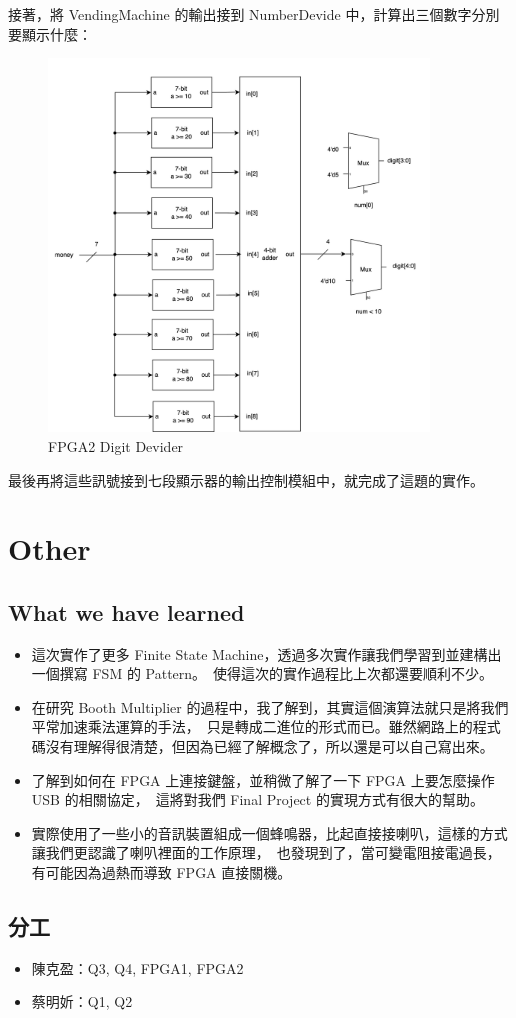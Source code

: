 \documentclass[10.5pt,compsoc,UTF8]{CjC}
\theoremstyle{mystyle}
\begin{document}
\newpage

接著，將 VendingMachine 的輸出接到 NumberDevide 中，計算出三個數字分別要顯示什麼：

\begin{figure}[h!]
  \centering
  \includegraphics[width=0.9\textwidth]{./img/FPGA2-digit.png}
  \caption{FPGA2 Digit Devider}
  \label{fig:FPGA2-digit}
\end{figure}

最後再將這些訊號接到七段顯示器的輸出控制模組中，就完成了這題的實作。

\newpage

\section{Other}

\subsection{What we have learned}
\begin{itemize}
  \item 這次實作了更多 Finite State Machine，透過多次實作讓我們學習到並建構出一個撰寫 FSM 的 Pattern。\
        使得這次的實作過程比上次都還要順利不少。
  \item 在研究 Booth Multiplier 的過程中，我了解到，其實這個演算法就只是將我們平常加速乘法運算的手法，\
        只是轉成二進位的形式而已。雖然網路上的程式碼沒有理解得很清楚，但因為已經了解概念了，所以還是可以自己寫出來。
  \item 了解到如何在 FPGA 上連接鍵盤，並稍微了解了一下 FPGA 上要怎麼操作 USB 的相關協定，\
        這將對我們 Final Project 的實現方式有很大的幫助。
  \item 實際使用了一些小的音訊裝置組成一個蜂鳴器，比起直接接喇叭，這樣的方式讓我們更認識了喇叭裡面的工作原理，\
        也發現到了，當可變電阻接電過長，有可能因為過熱而導致 FPGA 直接關機。
\end{itemize}

\subsection{分工}
\begin{itemize}
  \item 陳克盈：Q3, Q4, FPGA1, FPGA2
  \item 蔡明妡：Q1, Q2
\end{itemize}
\end{document}
